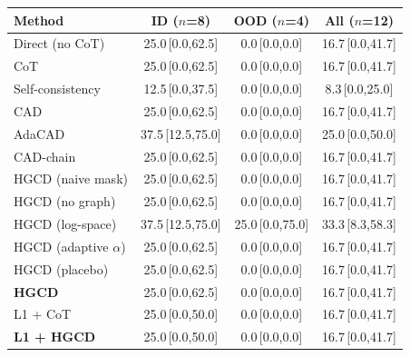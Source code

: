 \begin{tabular}{lccc}
\toprule
Method & ID ($n$=8) & OOD ($n$=4) & All ($n$=12) \\
\midrule
Direct (no CoT) & 25.0\,{\scriptsize[0.0,62.5]} & 0.0\,{\scriptsize[0.0,0.0]} & 16.7\,{\scriptsize[0.0,41.7]} \\
CoT & 25.0\,{\scriptsize[0.0,62.5]} & 0.0\,{\scriptsize[0.0,0.0]} & 16.7\,{\scriptsize[0.0,41.7]} \\
Self-consistency & 12.5\,{\scriptsize[0.0,37.5]} & 0.0\,{\scriptsize[0.0,0.0]} & 8.3\,{\scriptsize[0.0,25.0]} \\
CAD & 25.0\,{\scriptsize[0.0,62.5]} & 0.0\,{\scriptsize[0.0,0.0]} & 16.7\,{\scriptsize[0.0,41.7]} \\
AdaCAD & 37.5\,{\scriptsize[12.5,75.0]} & 0.0\,{\scriptsize[0.0,0.0]} & 25.0\,{\scriptsize[0.0,50.0]} \\
CAD-chain & 25.0\,{\scriptsize[0.0,62.5]} & 0.0\,{\scriptsize[0.0,0.0]} & 16.7\,{\scriptsize[0.0,41.7]} \\
HGCD (naive mask) & 25.0\,{\scriptsize[0.0,62.5]} & 0.0\,{\scriptsize[0.0,0.0]} & 16.7\,{\scriptsize[0.0,41.7]} \\
HGCD (no graph) & 25.0\,{\scriptsize[0.0,62.5]} & 0.0\,{\scriptsize[0.0,0.0]} & 16.7\,{\scriptsize[0.0,41.7]} \\
HGCD (log-space) & 37.5\,{\scriptsize[12.5,75.0]} & 25.0\,{\scriptsize[0.0,75.0]} & 33.3\,{\scriptsize[8.3,58.3]} \\
HGCD (adaptive $\alpha$) & 25.0\,{\scriptsize[0.0,62.5]} & 0.0\,{\scriptsize[0.0,0.0]} & 16.7\,{\scriptsize[0.0,41.7]} \\
HGCD (placebo) & 25.0\,{\scriptsize[0.0,62.5]} & 0.0\,{\scriptsize[0.0,0.0]} & 16.7\,{\scriptsize[0.0,41.7]} \\
\textbf{HGCD} & 25.0\,{\scriptsize[0.0,62.5]} & 0.0\,{\scriptsize[0.0,0.0]} & 16.7\,{\scriptsize[0.0,41.7]} \\
L1 + CoT & 25.0\,{\scriptsize[0.0,50.0]} & 0.0\,{\scriptsize[0.0,0.0]} & 16.7\,{\scriptsize[0.0,41.7]} \\
\textbf{L1 + HGCD} & 25.0\,{\scriptsize[0.0,50.0]} & 0.0\,{\scriptsize[0.0,0.0]} & 16.7\,{\scriptsize[0.0,41.7]} \\
\bottomrule
\end{tabular}
